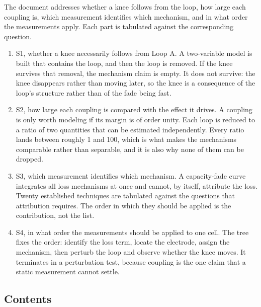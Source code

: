 \documentclass[11pt,a4paper]{article}
\begin{document}
The document addresses whether a knee follows from the loop, how large each coupling is, which measurement identifies which mechanism, and in what order the measurements apply. Each part is tabulated against the corresponding question.


\begin{enumerate}
  \item S1, whether a knee necessarily follows from Loop A. A two-variable model is built that contains the loop, and then the loop is removed. If the knee survives that removal, the mechanism claim is empty. It does not survive: the knee disappears rather than moving later, so the knee is a consequence of the loop's structure rather than of the fade being fast.
  \item S2, how large each coupling is compared with the effect it drives. A coupling is only worth modeling if its margin is of order unity. Each loop is reduced to a ratio of two quantities that can be estimated independently. Every ratio lands between roughly 1 and 100, which is what makes the mechanisms comparable rather than separable, and it is also why none of them can be dropped.
  \item S3, which measurement identifies which mechanism. A capacity-fade curve integrates all loss mechanisms at once and cannot, by itself, attribute the loss. Twenty established techniques are tabulated against the questions that attribution requires. The order in which they should be applied is the contribution, not the list.
  \item S4, in what order the measurements should be applied to one cell. The tree fixes the order: identify the loss term, locate the electrode, assign the mechanism, then perturb the loop and observe whether the knee moves. It terminates in a perturbation test, because coupling is the one claim that a static measurement cannot settle.
\end{enumerate}


\subsection*{Contents}
\end{document}
